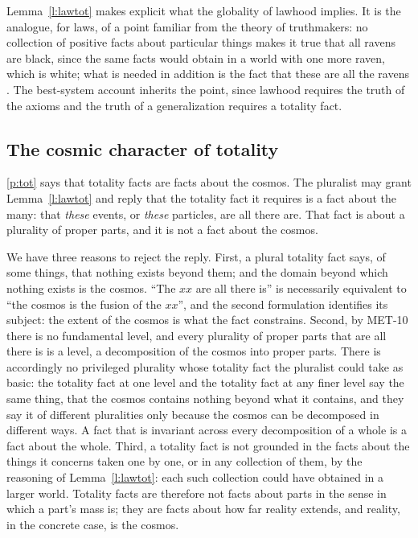 \documentclass{situationist-preprint}
\begin{document}
Lemma~\ref{l:lawtot} makes explicit what the globality of lawhood implies. It is the analogue, for laws, of a point familiar from the theory of truthmakers: no collection of positive facts about particular things makes it true that all ravens are black, since the same facts would obtain in a world with one more raven, which is white; what is needed in addition is the fact that these are all the ravens \citep{Armstrong1997}. The best-system account inherits the point, since lawhood requires the truth of the axioms and the truth of a generalization requires a totality fact.

\subsection{The cosmic character of totality}\label{s:totality}

\ref{p:tot} says that totality facts are facts about the cosmos. The pluralist may grant Lemma~\ref{l:lawtot} and reply that the totality fact it requires is a fact about the many: that \emph{these} events, or \emph{these} particles, are all there are. That fact is about a plurality of proper parts, and it is not a fact about the cosmos.

We have three reasons to reject the reply. First, a plural totality fact says, of some things, that nothing exists beyond them; and the domain beyond which nothing exists is the cosmos. \enquote{The $xx$ are all there is} is necessarily equivalent to \enquote{the cosmos is the fusion of the $xx$}, and the second formulation identifies its subject: the extent of the cosmos is what the fact constrains. Second, by MET-10 there is no fundamental level, and every plurality of proper parts that are all there is is a level, a decomposition of the cosmos into proper parts. There is accordingly no privileged plurality whose totality fact the pluralist could take as basic: the totality fact at one level and the totality fact at any finer level say the same thing, that the cosmos contains nothing beyond what it contains, and they say it of different pluralities only because the cosmos can be decomposed in different ways. A fact that is invariant across every decomposition of a whole is a fact about the whole. Third, a totality fact is not grounded in the facts about the things it concerns taken one by one, or in any collection of them, by the reasoning of Lemma~\ref{l:lawtot}: each such collection could have obtained in a larger world. Totality facts are therefore not facts about parts in the sense in which a part's mass is; they are facts about how far reality extends, and reality, in the concrete case, is the cosmos.
\end{document}
